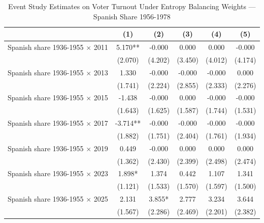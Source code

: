 \begin{table}[!h]
\caption{Event Study Estimates on Voter Turnout Under Entropy Balancing Weights — Spanish Share 1956-1978}
\renewcommand{\arraystretch}{1.25}
\centering
\begin{tabular}[t]{lccccc}
\hline
  & (1) & (2) & (3) & (4) & (5)\\
\hline
Spanish share 1936-1955 $\times$ 2011 & 5.170** & -0.000 & 0.000 & 0.000 & -0.000\\
 & (2.070) & (4.202) & (3.450) & (4.012) & (4.174)\\
Spanish share 1936-1955 $\times$ 2013 & 1.330 & -0.000 & -0.000 & -0.000 & 0.000\\
 & (1.741) & (2.224) & (2.855) & (2.333) & (2.276)\\
Spanish share 1936-1955 $\times$ 2015 & -1.438 & -0.000 & 0.000 & -0.000 & -0.000\\
 & (1.643) & (1.625) & (1.587) & (1.744) & (1.531)\\
Spanish share 1936-1955 $\times$ 2017 & -3.714** & -0.000 & -0.000 & -0.000 & -0.000\\
 & (1.882) & (1.751) & (2.404) & (1.761) & (1.934)\\
Spanish share 1936-1955 $\times$ 2019 & 0.449 & -0.000 & 0.000 & 0.000 & 0.000\\
 & (1.362) & (2.430) & (2.399) & (2.498) & (2.474)\\
Spanish share 1936-1955 $\times$ 2023 & 1.898* & 1.374 & 0.442 & 1.107 & 1.341\\
 & (1.121) & (1.533) & (1.570) & (1.597) & (1.500)\\
Spanish share 1936-1955 $\times$ 2025 & 2.131 & 3.855* & 2.777 & 3.234 & 3.644\\
 & (1.567) & (2.286) & (2.469) & (2.201) & (2.382)\\


\end{tabular}
\end{table}
